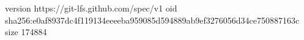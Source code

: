 version https://git-lfs.github.com/spec/v1
oid sha256:e0af8937dc4f119134eeeeba959085d594889ab9ef3276056d34ce750887163c
size 174884
